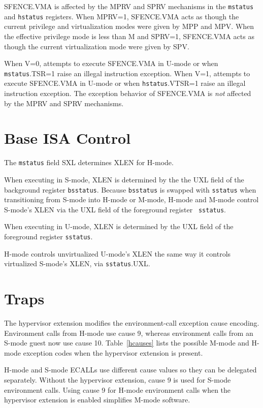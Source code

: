 SFENCE.VMA is affected by the MPRV and SPRV mechanisms in the {\tt mstatus}
and {\tt hstatus} registers.  When MPRV=1, SFENCE.VMA acts as though the
current privilege and virtualization modes were given by MPP and MPV.  When
the effective privilege mode is less than M and SPRV=1, SFENCE.VMA acts as
though the current virtualization mode were given by SPV.

When V=0, attempts to execute SFENCE.VMA in U-mode or when {\tt mstatus}.TSR=1
raise an illegal instruction exception.  When V=1, attempts to execute
SFENCE.VMA in U-mode or when {\tt hstatus}.VTSR=1 raise an illegal instruction
exception.  The exception behavior of SFENCE.VMA is {\em not} affected by the
MPRV and SPRV mechanisms.

\section{Base ISA Control}

The {\tt mstatus} field SXL determines XLEN for H-mode.

When executing in S-mode, XLEN is determined by the the UXL field of the
background register {\tt bsstatus}.  Because {\tt bsstatus} is swapped with
{\tt sstatus} when transitioning from S-mode into H-mode or M-mode, H-mode and
M-mode control S-mode's XLEN via the UXL field of the foreground register {\tt
sstatus}.

When executing in U-mode, XLEN is determined by the UXL field of the foreground register {\tt sstatus}.

\begin{commentary}
H-mode controls unvirtualized U-mode's XLEN the same way it controls virtualized S-mode's XLEN, via
{\tt sstatus}.UXL.
\end{commentary}

\section{Traps}

The hypervisor extension modifies the environment-call exception cause
encoding.  Environment calls from H-mode use cause 9, whereas environment
calls from an S-mode guest now use cause 10.  Table~\ref{hcauses} lists the
possible M-mode and H-mode exception codes when the hypervisor extension is
present.

\begin{commentary}
H-mode and S-mode ECALLs use different cause values so they can be delegated
separately.  Without the hypervisor extension, cause 9 is used for S-mode
environment calls.  Using cause 9 for H-mode environment calls when the
hypervisor extension is enabled simplifies M-mode software.
\end{commentary}

